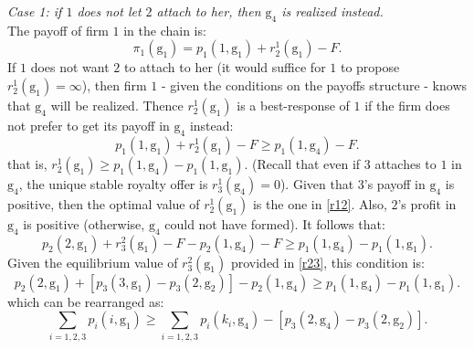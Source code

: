 \documentclass{article}
\begin{document}
\textit{Case 1: if $1$ does not let $2$ attach to her, then $\text{g}_{4}$ is realized instead.}\\

The payoff of firm $1$ in the chain is: 
\begin{equation*}
    \pi_1(\text{g}_1)=p_1(1,\text{g}_1)+r^1_2(\text{g}_1) -F.
\end{equation*}
If $1$ does not want $2$ to attach to her (it would suffice for $1$ to propose $r^1_2(\text{g}_1)=\infty$), then firm $1$ - given the conditions on the payoffs structure - knows that $\text{g}_4$ will be
realized. Thence $r^1_2(\text{g}_1)$ is a best-response of $1$ if the firm does not prefer to get its payoff in $\text{g}_4$ instead:\\
\begin{equation*}
    p_1(1,\text{g}_1)+r^1_2(\text{g}_1)-F\geq p_1(1,\text{g}_4)-F.
\end{equation*}
that is, $r^1_2(\text{g}_1)\geq p_1(1,\text{g}_4)-p_1(1,\text{g}_1)$. 
(Recall that even if $3$ attaches to $1$ in $\text{g}_4$, the unique stable royalty offer is $r^1_3(\text{g}_4)=0$). Given that $3$'s payoff in $\text{g}_4$ is positive, then the optimal value of $r^1_2(\text{g}_1)$ is the one in \eqref{r12}. Also, $2$'s profit in $\text{g}_4$ is positive (otherwise, $\text{g}_4$ could not have formed). It follows that:
\begin{equation*}
    p_2(2,\text{g}_1)+r^2_3(\text{g}_1)-F -p_2(1,\text{g}_4)-F \geq p_1(1,\text{g}_4)-p_1(1,\text{g}_1).
\end{equation*}
Given the equilibrium value of $r^2_3(\text{g}_1)$ provided in \eqref{r23}, this condition is: 
\begin{equation*}
    p_2(2,\text{g}_1)+[p_3(3,\text{g}_1)-p_3(2,\text{g}_2)]-p_2(1,\text{g}_4)\geq p_1(1,\text{g}_4)-p_1(1,\text{g}_1). 
\end{equation*}
which can be rearranged as: 
\begin{equation}
    \sum_{i=1,2,3} p_i(i,\text{g}_1)\geq \sum_{i=1,2,3}p_i(k_i,\text{g}_4)-[p_3(2,\text{g}_4)-p_3(2,\text{g}_2)].
\end{equation}
\end{document}
